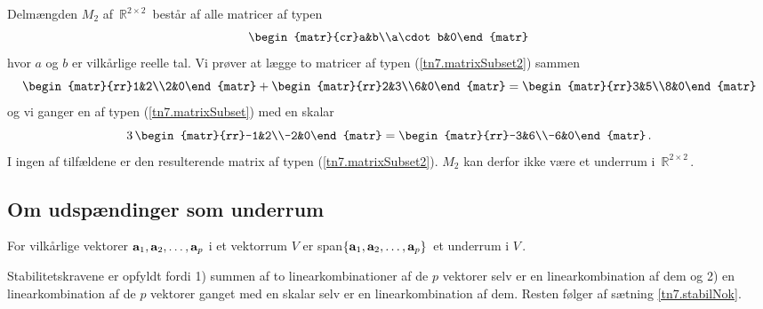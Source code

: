 \begin{example}
Delmængden $M_2$ af $\,\mathbb R^{2\times 2}\,$ består af alle matricer af typen
\begin{equation}\label{tn7.matrixSubset2}
\begin{matr}{cr}a&b\\a\cdot b&0\end{matr}\,
\end{equation}
hvor $a$ og $b$ er vilkårlige reelle tal. Vi prøver at lægge to matricer af typen (\ref{tn7.matrixSubset2}) sammen
$$
\begin{matr}{rr}1&2\\2&0\end{matr}+\begin{matr}{rr}2&3\\6&0\end{matr}=\begin{matr}{rr}3&5\\8&0\end{matr}
$$
og vi ganger en af typen (\ref{tn7.matrixSubset}) med en skalar
$$ 
3\,\begin{matr}{rr}-1&2\\-2&0\end{matr}=\begin{matr}{rr}-3&6\\-6&0\end{matr}\,.
$$
I ingen af tilfældene er den resulterende matrix af typen (\ref{tn7.matrixSubset2}). $M_2$ kan derfor ikke være et underrum i $\,\mathbb R^{2\times 2}\,$. 
\end{example}



\subsection{Om udspændinger som underrum}

\begin{theorem}\label{tn7.spanErUrum}
For vilkårlige vektorer $\mathbf{a}_1,\mathbf{a}_2,\ldots,\mathbf{a}_p$ i et vektorrum $V$ er span$\{\mathbf{a}_1,\mathbf{a}_2,\ldots,\mathbf{a}_p\}\,$ et underrum i $V\,$.
\end{theorem}
\begin{bevis}
Stabilitetskravene er opfyldt fordi 1) summen af to linearkombinationer af de $p$ vektorer selv er en linearkombination af dem og 2) en linearkombination af de $p$ vektorer ganget med en skalar selv er en linearkombination af dem. Resten følger af sætning \ref{tn7.stabilNok}.
\end{bevis}

